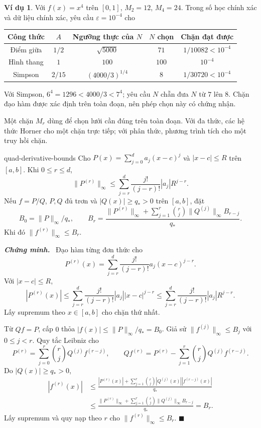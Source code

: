 \documentclass[12pt,a4paper,oneside]{book}
\numberwithin{algorithm}{chapter}
\theoremstyle{definition}
\newtheorem{vidu}{Ví dụ}[chapter]
\newenvironment{chungminh}{\par\medskip\noindent\textbf{\textit{\color{mainblue}Chứng minh.}}\ }{\hfill$\blacksquare$\par\medskip}
\begin{document}
\begin{vidu}
Với $f(x)=x^4$ trên $[0,1]$, $M_2=12$, $M_4=24$. Trong số học chính xác và dữ liệu chính xác, yêu cầu $\varepsilon=10^{-4}$ cho
\begin{center}
\begin{tabular}{c|c|c|c|c}
\toprule
Công thức & $A$ & Ngưỡng thực của $N$ & $N$ chọn & Chặn đạt được\\
\midrule
Điểm giữa & $1/2$ & $\sqrt{5000}$ & $71$ & $1/10082<10^{-4}$\\
Hình thang & $1$ & $100$ & $100$ & $10^{-4}$\\
Simpson & $2/15$ & $(4000/3)^{1/4}$ & $8$ & $1/30720<10^{-4}$\\
\bottomrule
\end{tabular}\end{center}
Với Simpson, $6^4=1296<4000/3<7^4$; yêu cầu $N$ chẵn đưa $N$ từ $7$ lên $8$. Chặn đạo hàm được xác định trên toàn đoạn, nên phép chọn này có chứng nhận.
\end{vidu}

Một chặn $M_r$ dùng để chọn lưới cần đúng trên toàn đoạn. Với đa thức, các hệ thức Horner cho một chặn trực tiếp; với phân thức, phương trình tích cho một truy hồi chặn.
\begin{menhde}{}{quad-derivative-bounds}
Cho $P(x)=\sum_{j=0}^d a_j(x-c)^j$ và $|x-c|\leq R$ trên $[a,b]$. Khi $0\leq r\leq d$,
\[
 \|P^{(r)}\|_\infty\leq\sum_{j=r}^d\frac{j!}{(j-r)!}|a_j|R^{j-r}.
\]
Nếu $f=P/Q$, $P,Q$ đủ trơn và $|Q(x)|\geq q_*>0$ trên $[a,b]$, đặt
\[
 B_0=\|P\|_\infty/q_*,\qquad
 B_r=\frac{\|P^{(r)}\|_\infty+\sum_{j=1}^r\binom rj\|Q^{(j)}\|_\infty B_{r-j}}{q_*}.
\]
Khi đó $\|f^{(r)}\|_\infty\leq B_r$.
\end{menhde}
\begin{chungminh}
Đạo hàm từng đơn thức cho
\[
 P^{(r)}(x)=\sum_{j=r}^d\frac{j!}{(j-r)!}a_j(x-c)^{j-r}.
\]
Với $|x-c|\leq R$,
\[
 |P^{(r)}(x)|
 \leq\sum_{j=r}^d\frac{j!}{(j-r)!}|a_j||x-c|^{j-r}
 \leq\sum_{j=r}^d\frac{j!}{(j-r)!}|a_j|R^{j-r}.
\]
Lấy supremum theo $x\in[a,b]$ cho chặn thứ nhất.

Từ $Qf=P$, cấp $0$ thỏa $|f(x)|\leq\|P\|_\infty/q_*=B_0$. Giả sử $\|f^{(j)}\|_\infty\leq B_j$ với $0\leq j<r$. Quy tắc Leibniz cho
\[
 P^{(r)}=\sum_{j=0}^r\binom rjQ^{(j)}f^{(r-j)},\qquad
 Qf^{(r)}=P^{(r)}-\sum_{j=1}^r\binom rjQ^{(j)}f^{(r-j)}.
\]
Do $|Q(x)|\geq q_*>0$,
\begin{align*}
 |f^{(r)}(x)|
 &\leq\frac{|P^{(r)}(x)|+\sum_{j=1}^r\binom rj|Q^{(j)}(x)||f^{(r-j)}(x)|}{q_*}\\
 &\leq\frac{\|P^{(r)}\|_\infty+\sum_{j=1}^r\binom rj\|Q^{(j)}\|_\infty B_{r-j}}{q_*}=B_r.
\end{align*}
Lấy supremum và quy nạp theo $r$ cho $\|f^{(r)}\|_\infty\leq B_r$.
\end{chungminh}
\end{document}
